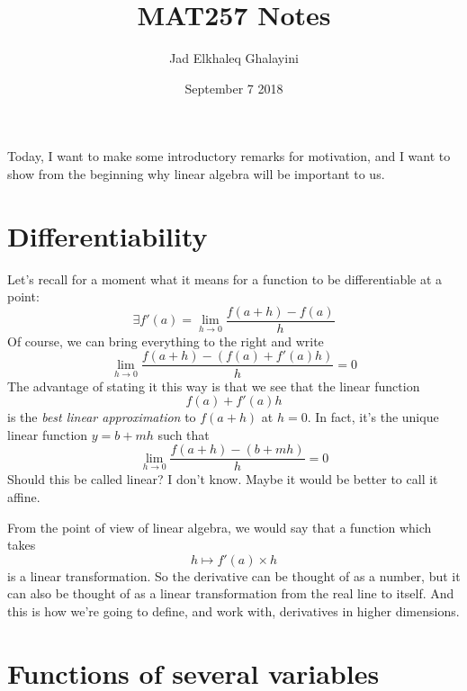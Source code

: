 \documentclass{article}
\title{MAT257 Notes}
\author{Jad Elkhaleq Ghalayini}
\date{September 7 2018}
\begin{document}
\maketitle

Today, I want to make some introductory remarks for motivation, and I want to show from the beginning why linear algebra will be important to us.
\section*{Differentiability}
Let's recall for a moment what it means for a function to be differentiable at a point:
\[\exists f'(a) = \lim_{h \to 0}\frac{f(a + h) - f(a)}{h}\]
Of course, we can bring everything to the right and write
\[\lim_{h \to 0}\frac{f(a + h) - (f(a) + f'(a)h)}{h} = 0\]
The advantage of stating it this way is that we see that the linear function
\[f(a) + f'(a)h\]
is the \textit{best linear approximation} to \(f(a + h)\) at \(h = 0\). In fact, it's the unique linear function \(y = b + mh\) such that
\[\lim_{h \to 0}\frac{f(a + h) - (b + mh)}{h} = 0\]
Should this be called linear? I don't know. Maybe it would be better to call it affine.

From the point of view of linear algebra, we would say that a function which takes
\[h \mapsto f'(a) \times h\]
is a linear transformation. So the derivative can be thought of as a number, but it can also be thought of as a linear transformation from the real line to itself. And this is how we're going to define, and work with, derivatives in higher dimensions.

\section*{Functions of several variables}
\end{document}
